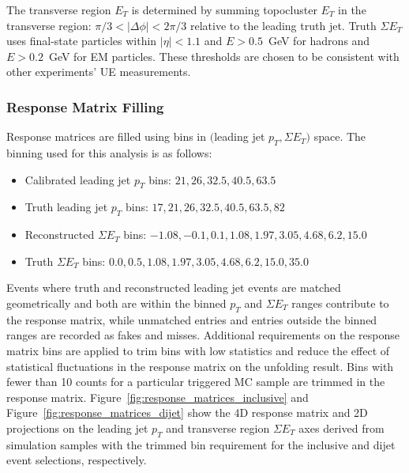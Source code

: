The transverse region $E_{T}$ is determined by summing topocluster $E_{T}$ in the transverse region: $\pi/3 < |\Delta\phi| < 2\pi/3$ relative to the leading truth jet. 
Truth $\Sigma E_{T}$ uses final-state particles within $|\eta|<1.1$ and $E > 0.5$~GeV for hadrons and $E > 0.2$~GeV for EM particles. These thresholds are chosen to be consistent with other experiments' UE measurements.

\subsubsection{Response Matrix Filling}

Response matrices are filled using bins in $($leading jet $p_{T}, \Sigma E_{T})$ space.
The binning used for this analysis is as follows: 
\begin{itemize}
    \item Calibrated leading jet $p_{T}$ bins: ${21, 26, 32.5, 40.5, 63.5}$ \GeV
    \item Truth leading jet $p_{T}$ bins: ${17, 21, 26, 32.5, 40.5, 63.5, 82}$ \GeV
    \item Reconstructed $\Sigma E_{T}$ bins: ${-1.08, -0.1, 0.1, 1.08, 1.97, 3.05, 4.68, 6.2, 15.0}$ \GeV
    \item Truth $\Sigma E_{T}$ bins: ${0.0, 0.5, 1.08, 1.97, 3.05, 4.68, 6.2, 15.0, 35.0}$ \GeV
\end{itemize}
Events where truth and reconstructed leading jet events are matched geometrically and both are within the binned $p_{T}$ and $\Sigma E_{T}$ ranges contribute to the response matrix, while unmatched entries and entries outside the binned ranges are recorded as fakes and misses. 
Additional requirements on the response matrix bins are applied to trim bins with low statistics and reduce the effect of statistical fluctuations in the response matrix on the unfolding result.
Bins with fewer than 10 counts for a particular triggered MC sample are trimmed in the response matrix.
Figure~\ref{fig:response_matrices_inclusive} and Figure~\ref{fig:response_matrices_dijet} show the 4D response matrix and 2D projections on the leading jet $p_{T}$ and transverse region $\Sigma E_{T}$ axes derived from simulation samples with the trimmed bin requirement for the inclusive and dijet event selections, respectively.

